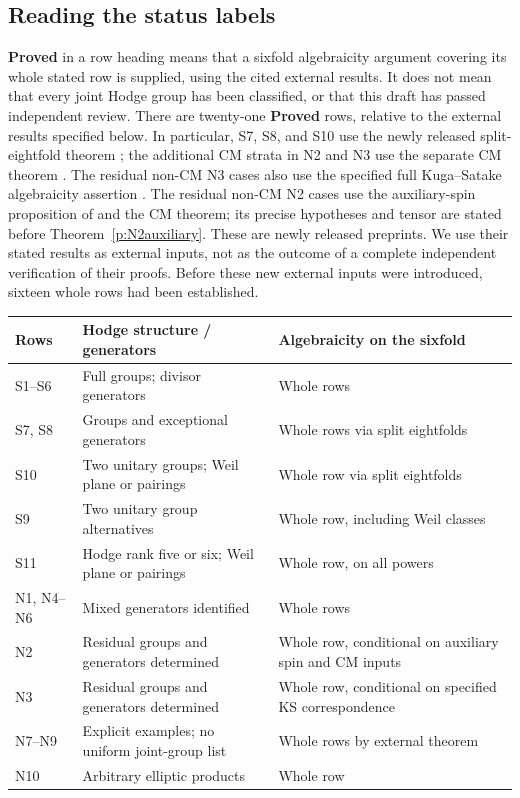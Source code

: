 \documentclass[11pt,reqno]{article}
\theoremstyle{emphasizedplain}
\DeclareRobustCommand{\provedstatus}{%
  \texorpdfstring{\textcolor{ProvedGreen}{\textbf{Proved}}}{Proved}}
\theoremstyle{emphasizeddefinition}
\theoremstyle{emphasizeddefinition}
\begin{document}
\subsection*{Reading the status labels}
\provedstatus{} in a row heading means that a sixfold algebraicity argument
covering its whole stated row is supplied, using the cited external
results. It does not mean that every joint Hodge group has been
classified, or that this draft has passed independent review.
There are twenty-one \provedstatus{} rows,
relative to the external results specified below. In particular,
S7, S8, and S10 use the newly released split-eightfold theorem
\cite[Theorem 1.1]{OpenAIEightfold}; the additional CM strata in N2 and
N3 use the separate CM theorem \cite[Theorem 1.1]{OpenAICM}.
The residual non-CM N3 cases also use the specified full
Kuga--Satake algebraicity assertion \cite[Theorem 1.1]{OpenAIKS}.
The residual non-CM N2 cases use the auxiliary-spin proposition
of \cite{OpenAIK3Products} and the CM theorem; its precise hypotheses
and tensor are stated before Theorem~\ref{p:N2auxiliary}.
These are newly released preprints. We use their
stated results as external inputs, not as the outcome of a complete
independent verification of their proofs. Before these new external
inputs were introduced, sixteen whole rows had been established.
\begin{center}
\begin{tabular}{>{\raggedright\arraybackslash}p{}>{\raggedright\arraybackslash}p{}>{\raggedright\arraybackslash}p{}}
\toprule
Rows & Hodge structure / generators & Algebraicity on the sixfold\\
\midrule
S1--S6 & Full groups; divisor generators & Whole rows\\
S7, S8 & Groups and exceptional generators & Whole rows via split eightfolds\\
S10 & Two unitary groups; Weil plane or pairings & Whole row via split eightfolds\\
S9 & Two unitary group alternatives & Whole row, including Weil classes\\
S11 & Hodge rank five or six; Weil plane or pairings & Whole row, on all powers\\
N1, N4--N6 & Mixed generators identified & Whole rows\\
N2 & Residual groups and generators determined & Whole row, conditional on auxiliary spin and CM inputs\\
N3 & Residual groups and generators determined & Whole row, conditional on specified KS correspondence\\
N7--N9 & Explicit examples; no uniform joint-group list & Whole rows by external theorem\\
N10 & Arbitrary elliptic products & Whole row\\
\bottomrule
\end{tabular}
\end{center}
\end{document}
